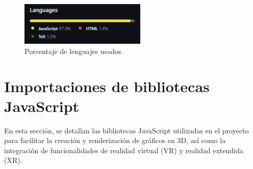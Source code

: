 \documentclass[a4paper, 12pt]{book}
\begin{document}
\begin{figure}
  \centering
  \includegraphics[width=6cm, keepaspectratio]{img/lenguajes.png}
  \caption{Porcentaje de lenguajes usados.}
  \label{fig:lenguajes}
\end{figure}


\section{Importaciones de bibliotecas JavaScript} 
\label{sec:importaciones}

En esta sección, se detallan las bibliotecas JavaScript utilizadas en el proyecto para facilitar la creación y renderización de gráficos en 3D, 
así como la integración de funcionalidades de realidad virtual (VR) y realidad extendida (XR).
\end{document}
